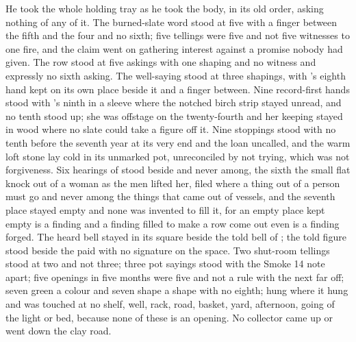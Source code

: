 \scenebreak

He took the whole holding tray as he took the body, in its old order, asking nothing of any of it. The burned-slate word stood at five with a finger between the fifth and the four and no sixth; five tellings were five and not five witnesses to one fire, and the claim went on gathering interest against a promise nobody had given. The row stood at five askings with one shaping and no witness and expressly no sixth asking. The well-saying stood at three shapings, with 's eighth hand kept on its own place beside it and a finger between. Nine record-first hands stood with 's ninth in a sleeve where the notched birch strip stayed unread, and no tenth stood up; she was offstage on the twenty-fourth and her keeping stayed in wood where no slate could take a figure off it. Nine stoppings stood with no tenth before the seventh year at its very end and the loan uncalled, and the warm loft stone lay cold in its unmarked pot, unreconciled by not trying, which was not forgiveness. Six hearings of  stood beside and never among, the sixth the small flat knock out of a woman as the men lifted her, filed where a thing out of a person must go and never among the things that came out of vessels, and the seventh place stayed empty and none was invented to fill it, for an empty place kept empty is a finding and a finding filled to make a row come out even is a finding forged. The heard bell stayed in its square beside the told bell of ; the told figure stood beside the paid with no signature on the space. Two shut-room tellings stood at two and not three; three pot sayings stood with the Smoke 14 note apart; five openings in five months were five and not a rule with the next far off; seven green a colour and seven shape a shape with no eighth;  hung where it hung and was touched at no shelf, well, rack, road, basket, yard, afternoon, going of the light or bed, because none of these is an opening. No collector came up or went down the clay road.


